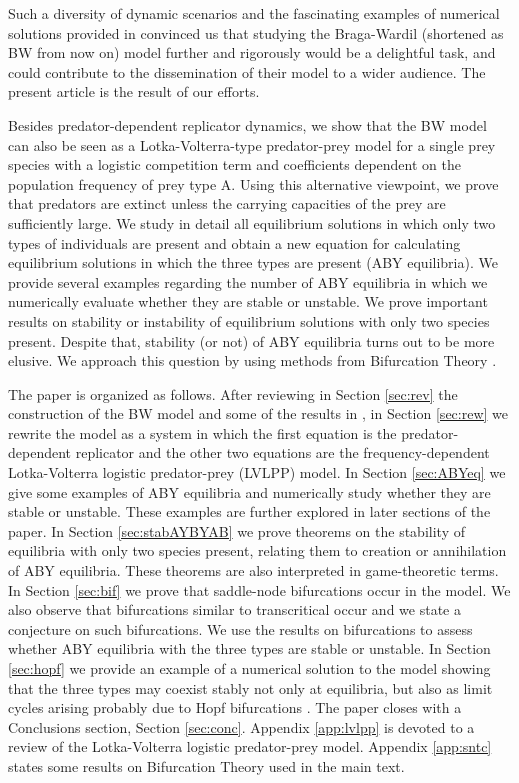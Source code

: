 \documentclass[12pt]{article}
\theoremstyle{definition}
\begin{document}
Such a diversity of dynamic scenarios and the fascinating examples of numerical solutions provided in \cite{bw} convinced us that studying the Braga-Wardil (shortened as BW from now on) model further and rigorously would be a delightful task, and could contribute to the dissemination of their model to a wider audience. The present article is the result of our efforts.

Besides predator-dependent replicator dynamics, we show that the BW model can also be seen as a Lotka-Volterra-type predator-prey model for a single prey species with a logistic competition term and coefficients dependent on the population frequency of prey type A. Using this alternative viewpoint, we prove that predators are extinct unless the carrying capacities of the prey are sufficiently large. We study in detail all equilibrium solutions in which only two types of individuals are present and obtain a new equation for calculating equilibrium solutions in which the three types are present (ABY equilibria). We provide several examples regarding the number of ABY equilibria in which we numerically evaluate whether they are stable or unstable. We prove important results on stability or instability of equilibrium solutions with only two species present. Despite that, stability (or not) of ABY equilibria turns out to be more elusive. We approach this question by using methods from Bifurcation Theory \cite{guckhol, perko}.

The paper is organized as follows. After reviewing in Section \ref{sec:rev} the construction of the BW model and some of the results in \cite{bw}, in Section \ref{sec:rew} we rewrite the model as a system in which the first equation is the predator-dependent replicator and the other two equations are the frequency-dependent Lotka-Volterra logistic predator-prey (LVLPP) model. In Section \ref{sec:ABYeq} we give some examples of ABY equilibria and numerically study whether they are stable or unstable. These examples are further explored in later sections of the paper.	In Section \ref{sec:stabAYBYAB} we prove theorems on the stability of equilibria with only two species present, relating them to creation or annihilation of ABY equilibria. These theorems are also interpreted in game-theoretic terms. In Section \ref{sec:bif} we prove that saddle-node bifurcations \cite{guckhol, perko} occur in the model. We also observe that bifurcations similar to transcritical occur and we state a conjecture on such bifurcations. We use the results on bifurcations to assess whether ABY equilibria with the three types are stable or unstable. In Section \ref{sec:hopf} we provide an example of a numerical solution to the model showing that the three types may coexist stably not only at equilibria, but also as limit cycles arising probably due to Hopf bifurcations \cite{guckhol, perko}. The paper closes with a Conclusions section, Section \ref{sec:conc}. Appendix \ref{app:lvlpp} is devoted to a review of the Lotka-Volterra logistic predator-prey model. Appendix \ref{app:sntc} states some results on Bifurcation Theory used in the main text.
\end{document}
